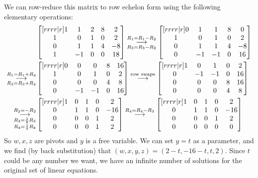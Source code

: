 \documentclass[10pt, a4paper]{amsart}
\newcommand{\grstep}[2][\relax]{%
   \ensuremath{\mathrel{
       {\mathop{\longrightarrow}\limits^{#2\mathstrut}_{
                                     \begin{subarray}{l} #1 \end{subarray}}}}}}
\theoremstyle{definition}
\theoremstyle{remark}
\begin{document}
We can row-reduce this matrix to row echelon form using the following
elementary operations:
\begin{align*}
  &\begin{bmatrix}[rrrr|r]
    1 &  1 & 2 & 8 & 2\\
    1 &  0 & 1 & 0 & 2\\
    0 &  1 & 1 & 4 & -8\\
    1 & -1 & 0 & 0 & 18
  \end{bmatrix}
  \grstep[R_3 = R_3 - R_2]{R_1 = R_1 - R_2}
  \begin{bmatrix}[rrrr|r]
    0 &  1 &  1 & 8 & 0\\
    1 &  0 &  1 & 0 & 2\\
    0 &  1 &  1 & 4 & -8\\
    0 & -1 & -1 & 0 & 16\\
  \end{bmatrix}\\
  \grstep[R_3 = R_3 + R_4]{R_1 = R_1 + R_4}
  &\begin{bmatrix}[rrrr|r]
    0 &  0 &  0 & 8 & 16\\
    1 &  0 &  1 & 0 & 2\\
    0 &  0 &  0 & 4 & 8\\
    0 & -1 & -1 & 0 & 16\\
  \end{bmatrix}
  \grstep{\text{row swaps}}
  \begin{bmatrix}[rrrr|r]
    1 &  0 &  1 & 0 & 2\\
    0 & -1 & -1 & 0 & 16\\
    0 &  0 &  0 & 8 & 16\\
    0 &  0 &  0 & 4 & 8\\
  \end{bmatrix}\\
  \grstep[R_3 = \frac{1}{8}R_3\\R_4 = \frac{1}{4}R_4]{R_2 = -R_2}
  &\begin{bmatrix}[rrrr|r]
    1 &  0 &  1 & 0 & 2\\
    0 &  1 &  1 & 0 & -16\\
    0 &  0 &  0 & 1 & 2\\
    0 &  0 &  0 & 1 & 2\\
  \end{bmatrix}
  \grstep{R_4 = R_4 - R_3}
  \begin{bmatrix}[rrrr|r]
    1 &  0 &  1 & 0 & 2\\
    0 &  1 &  1 & 0 & -16\\
    0 &  0 &  0 & 1 & 2\\
    0 &  0 &  0 & 0 & 0\\
  \end{bmatrix}
\end{align*}
So $ w,x,z $ are pivots and $ y $ is a free variable. We can set $ y = t $
as a parameter, and we find (by back substitution) that $ (w,x,y,z) = (2-t, -16-t, t, 2) $. Since
$ t $ could be any number we want, we have an infinite number of solutions
for the original set of linear equations.
\end{document}
